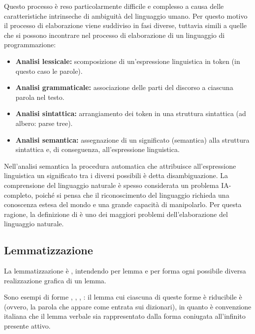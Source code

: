 \documentclass{article}
\theoremstyle{plain}
\theoremstyle{definition}
\begin{document}
Questo processo è reso particolarmente difficile e complesso a causa delle caratteristiche intrinseche di ambiguità del linguaggio umano. Per questo motivo il processo di elaborazione viene suddiviso in fasi diverse, tuttavia simili a quelle che si possono incontrare nel processo di elaborazione di un linguaggio di programmazione:

\begin{itemize}
\item \textbf{Analisi lessicale:} scomposizione di un'espressione linguistica in token (in questo caso le parole).
\item \textbf{Analisi grammaticale:} associazione delle parti del discorso a ciascuna parola nel testo.
\item \textbf{Analisi sintattica:} arrangiamento dei token in una struttura sintattica (ad albero: parse tree).
\item  \textbf{Analisi semantica:} assegnazione di un significato (semantica) alla struttura sintattica e, di conseguenza, all'espressione linguistica.
\end{itemize}


Nell'analisi semantica la procedura automatica che attribuisce all'espressione linguistica un significato tra i diversi possibili è detta disambiguazione.
La comprensione del linguaggio naturale è spesso considerata un problema IA-completo, poiché si pensa che il riconoscimento del linguaggio richieda una conoscenza estesa del mondo e una grande capacità di manipolarlo. Per questa ragione, la definizione di  è uno dei maggiori problemi dell'elaborazione del linguaggio naturale.\footnotemark
{}



\subsection{Lemmatizzazione}
La lemmatizzazione è , intendendo per lemma  e per forma ogni possibile
diversa realizzazione grafica di un lemma.\footnotemark
{}

Sono esempi di forme , , , : il lemma cui ciascuna di queste forme è riducibile è  (ovvero, la parola che appare come entrata sui dizionari), in quanto è convenzione italiana che il lemma verbale sia rappresentato dalla forma coniugata all'infinito presente attivo.
\end{document}
